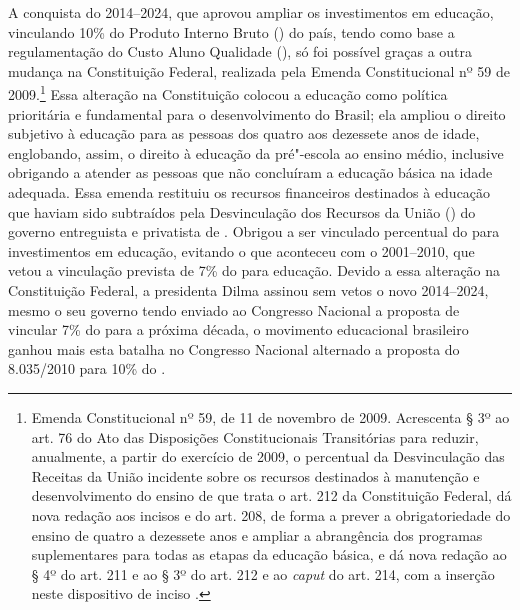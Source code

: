 A conquista do  2014--2024, que aprovou ampliar os investimentos em
educação, vinculando 10\% do Produto Interno Bruto () do país, tendo
como base a regulamentação do Custo Aluno Qualidade (), só foi
possível graças a outra mudança na Constituição Federal, realizada pela
Emenda Constitucional nº 59 de 2009.\footnote{Emenda
  Constitucional nº 59, de 11 de novembro de 2009. Acrescenta § 3º ao
  art. 76 do Ato das Disposições Constitucionais Transitórias para
  reduzir, anualmente, a partir do exercício de 2009, o percentual da
  Desvinculação das Receitas da União incidente sobre os recursos
  destinados à manutenção e desenvolvimento do ensino de que trata o
  art. 212 da Constituição Federal, dá nova redação aos incisos  e 
  do art. 208, de forma a prever a obrigatoriedade do ensino de quatro a
  dezessete anos e ampliar a abrangência dos programas suplementares
  para todas as etapas da educação básica, e dá nova redação ao § 4º do
  art. 211 e ao § 3º do art. 212 e ao \emph{caput} do art. 214, com a
  inserção neste dispositivo de inciso .} Essa alteração na
Constituição colocou a educação como política prioritária e fundamental
para o desenvolvimento do Brasil; ela ampliou o direito subjetivo à
educação para as pessoas dos quatro aos dezessete anos de idade,
englobando, assim, o direito à educação da pré"-escola ao ensino médio,
inclusive obrigando a atender as pessoas que não concluíram a educação
básica na idade adequada. Essa emenda restituiu os recursos financeiros
destinados à educação que haviam sido subtraídos pela Desvinculação dos
Recursos da União () do governo entreguista e privatista de .
Obrigou a ser vinculado percentual do  para investimentos
em educação, evitando o que aconteceu com o  2001--2010, que  vetou
a vinculação prevista de 7\% do  para educação. Devido a essa
alteração na Constituição Federal, a presidenta Dilma assinou sem vetos
o novo  2014--2024, mesmo o seu governo tendo enviado ao Congresso
Nacional a proposta de vincular 7\% do  para a próxima década, o
movimento educacional brasileiro ganhou mais esta batalha no Congresso
Nacional alternado a proposta do  8.035/2010 para 10\% do .

